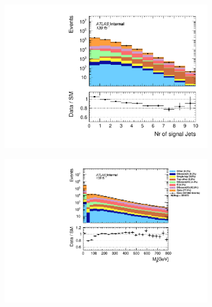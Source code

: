 \begin{figure}[H]
{\begin{subfigure}{.405\textwidth}
        \includegraphics[width=\textwidth]{Figures/FeaturesHistograms/MCvsData/njet_SG.pdf}
        \caption{}
        \label{fig:njet_SG}
    \end{subfigure}
    \hfill
    \begin{subfigure}{.525\textwidth}
        \includegraphics[width=\textwidth]{Figures/FeaturesHistograms/MCvsData/M_jj.pdf}
        \caption{}
        \label{fig:M_jj}
    \end{subfigure}
    }
\end{figure}
